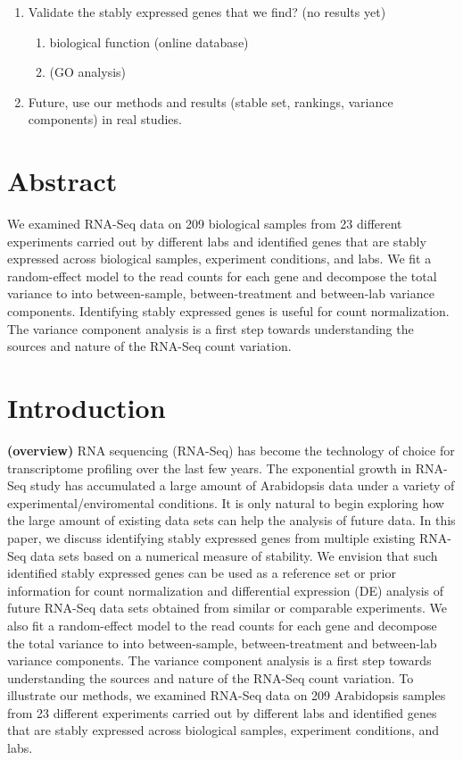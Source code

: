 \documentclass[11pt, a4paper]{article}
\begin{document}
\begin{enumerate}
    \item
	Validate the stably expressed genes that we find? (no results yet) 
	\begin{enumerate}
	    \item
		biological function (online database) 
	    \item
		(GO analysis)
	\end{enumerate}

    \item
	Future, use our methods and results (stable set, rankings, variance
	components) in real studies.
\end{enumerate}

\newpage
\maketitle

\section*{Abstract}
We examined RNA-Seq data on 209 biological samples from 23 different
experiments carried out by different labs and identified genes that are stably
expressed across biological samples, experiment conditions, and labs. We fit a
random-effect model to the read counts for each gene and decompose the total
variance to into between-sample, between-treatment and between-lab variance
components. Identifying stably expressed genes is useful for count
normalization. The variance component analysis is a first step towards
understanding the sources and nature of the RNA-Seq count variation.


\section{Introduction}

\textbf{(overview)}
RNA sequencing (RNA-Seq) has become the technology of choice for transcriptome
profiling over the last few years. The exponential growth in RNA-Seq study has
accumulated a large amount of Arabidopsis data under a variety of
experimental/enviromental conditions.  It is only natural to begin exploring
how the large amount of existing data sets can help the analysis of future
data.  In this paper, we discuss identifying stably expressed genes from
multiple existing RNA-Seq data sets based on a numerical measure of stability.
We envision that such identified stably expressed genes can be used as a
reference set or prior information for count normalization and differential
expression (DE) analysis of future RNA-Seq data sets obtained from similar or
comparable experiments.  We also fit a random-effect model to the read counts
for each gene and decompose the total variance to into between-sample,
between-treatment and between-lab variance components. The variance component
analysis is a first step towards understanding the sources and nature of the
RNA-Seq count variation.  To illustrate our methods, we examined RNA-Seq data
on 209 Arabidopsis  samples from 23 different experiments carried out by
different labs and identified genes that are stably expressed across
biological samples, experiment conditions, and labs.  
\end{document}

